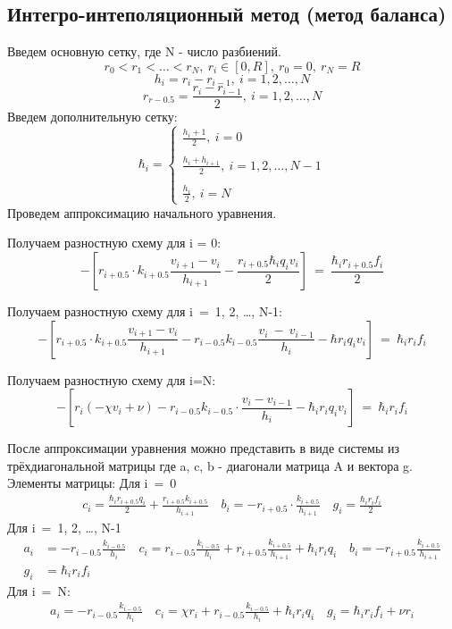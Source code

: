 \subsection{Интегро-интеполяционный метод (метод баланса)}

Введем основную сетку, где N - число разбиений.
\[r_0 < r_1 < \dots < r_N,\ r_i \in [0, R],\ r_0 = 0,\ r_N = R\]
\[
  h_i =r_i - r_{i-1},\ i=1,2, \dots, N
\]
\[
  r_{r-0.5} = \frac{r_i - r_{i-1}}{2},\ i=1,2, \dots, N
\]
Введем дополнительную сетку:
\[
  \hbar_i = \begin{cases}
    \frac{h_i + 1}{2},\ i = 0 \\ \\
    \frac{h_i + h_{i+1}}{2},\ i = 1, 2, \dots, N-1 \\ \\
    \frac{h_i}{2},\ i = N
  \end{cases}
\]
Проведем аппроксимацию начального уравнения.

Получаем разностную схему для i = 0:
\[
  -\left[ r_{i+0.5} \cdot k_{i+0.5}\frac{v_{i+1}-v_i}{h_{i+1}} - \frac{r_{i+0.5} \hbar_i q_i v_i}{2} \right]\ =\ \frac{\hbar_i r_{i+0.5} f_i}{2}
\]

Получаем разностную схему для i\ =\ 1, 2, \dots, N-1:
\[
  -\left[ r_{i+0.5} \cdot k_{i+0.5}\frac{v_{i+1}-v_i}{h_{i+1}} - r_{i-0.5}k_{i-0.5}\frac{v_{i}\ -\ v_{i-1}}{h_{i}} - \hbar r_i q_i v_i\right]\ =\ \hbar_ir_if_i
\]

Получаем разностную схему для i=N:
\[
  -\left[ r_i (-\chi v_i + \nu) - r_{i-0.5}k_{i-0.5} \cdot \frac{v_i-v_{i-1}}{h_i}- \hbar_ir_iq_iv_i \right]\ =\ \hbar_ir_if_i
\]

После аппроксимации уравнения можно представить в виде системы из трёхдиагональной матрицы где a, c, b - диагонали матрица A и вектора g. Элементы матрицы:\newline
Для i\ =\ 0
\begin{align*}
  c_i = \frac{\hbar_i r_{i+0.5} q_i}{2} + \frac{r_{i+0.5} k_{i+0.5}}{h_{i+1}} \quad
  b_i = -r_{i+0.5} \cdot \frac{k_{i+0.5}}{h_{i+1}} \quad
  g_i = \frac{\hbar_i r_i f_i}{2}
\end{align*}
Для i\ =\ 1, 2, \dots, N-1
\begin{align*}
  a_i &= -r_{i-0.5}\frac{k_{i-0.5}}{h_i} \quad
  c_i = r_{i-0.5}\frac{k_{i-0.5}}{h_i} + r_{i+0.5}\frac{k_{i+0.5}}{h_{i+1}} + \hbar_i r_iq_i \quad
  b_i = -r_{i+0.5}\frac{k_{i+0.5}}{h_{i+1}} \\
  g_i &= \hbar_i r_i f_i
\end{align*}
Для i\ =\ N:
\begin{align*}
  a_i = -r_{i-0.5}\frac{k_{i-0.5}}{h_i} \quad
  c_i = \chi r_i + r_{i-0.5}\frac{k_{i-0.5}}{h_i} + \hbar_i r_iq_i \quad
  g_i = \hbar_i r_i f_i + \nu r_i
\end{align*}
